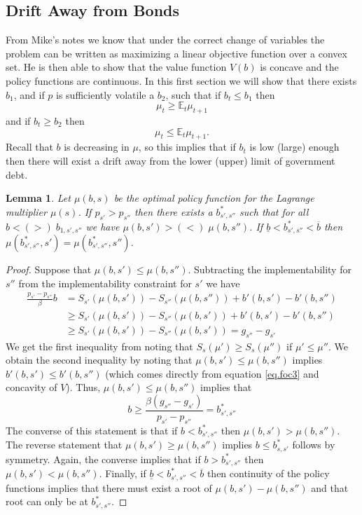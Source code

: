 \documentclass[12pt]{article}
\newcommand{\EE}{\mathbb E}
\newtheorem{lemma}{Lemma}
\begin{document}
\subsection{Drift Away from Bonds}\label{sec.drift}
From Mike's notes we know that under the correct change of variables the problem can be written as maximizing a linear objective function over a convex set.  He is then able to show that the value function $V(b)$ is concave and the policy functions are continuous.  In this first section we will show that there exists $b_1$, and if $p$ is sufficiently volatile a $b_2$, such that if $b_t\leq b_1$ then 
\[
	\mu_t \geq \EE_t \mu_{t+1}
\] and if $b_t \geq b_2$ then
\[
	\mu_t \leq \EE_t \mu_{t+1}.
\]  Recall that $b$ is decreasing in $\mu$, so this implies that if $b_t$ is low (large) enough then there will exist a drift away from the lower (upper) limit of government debt.
\begin{lemma}  Let $\mu(b,s)$ be the optimal policy function for the Lagrange multiplier $\mu(s)$.  If $p_{s'} > p_{s''}$ then there exists a $b^*_{s',s''}$ such that for all $b < (>) \; b_{1,s',s''}$ we have $\mu(b,s') > (<) \;\mu(b,s'')$.  If $\underline b < b^*_{s',s''} < \overline b$ then $\mu(b^*_{s',s''},s') = \mu(b^*_{s',s''},s'')$.
\label{lem.order}
\end{lemma}
\begin{proof} 
Suppose that $\mu(b,s')\leq \mu(b,s'')$.  Subtracting the implementability for $s''$ from the implementability constraint for $s'$ we have 
\begin{align*}
	\frac{p_{s'}-p_{s''}}{\beta}b &= S_{s'}(\mu(b,s'))-S_{s''}(\mu(b,s'')) + b'(b,s')-b'(b,s'')\\
						&\geq S_{s'}(\mu(b,s')) -S_{s''}(\mu(b,s')) + b'(b,s')-b'(b,s'')\\
						&\geq  S_{s'}(\mu(b,s')) -S_{s''}(\mu(b,s')) = g_{s''}-g_{s'}
\end{align*}  We get the first inequality from noting that $S_s(\mu')\geq S_s(\mu'')$ if $\mu' \leq \mu''$.  We obtain the second inequality by noting that $\mu(b,s')\leq \mu(b,s'')$ implies $b'(b,s')\leq b'(b,s'')$ (which comes directly from equation \eqref{eq.foc3} and concavity of $V$).  Thus, $\mu(b,s')\leq \mu(b,s'')$ implies that 
\[
	b \geq \frac{\beta(g_{s''}-g_{s'})}{p_{s'}-p_{s''}} = b^*_{s',s''}
\]The converse of this statement is that if $b<b^*_{s',s''}$ then $\mu(b,s') > \mu(b,s'')$.  The reverse statement that $\mu(b,s') \geq \mu(b,s'')$ implies $b \leq b^*_{s,s'}$ follows by symmetry.   Again, the converse implies that if $b > b^*_{s',s''}$ then $\mu(b,s') < \mu(b,s'')$.    Finally, if $\underline b < b^*_{s',s''} <\overline b$ then continuity of the policy functions implies that there must exist a root of $\mu(b,s')-\mu(b,s'')$ and that root can only be at $b^*_{s',s''}$.
\end{proof}
\end{document}

